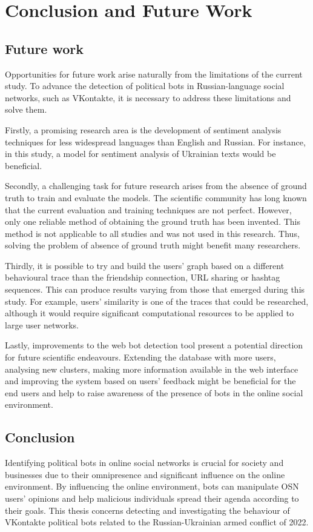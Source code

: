 \chapter{Conclusion and Future Work}
\label{ch:conclusion}

\section{Future work}
Opportunities for future work arise naturally from the limitations of the current study. To advance the detection of political bots in Russian-language social networks, such as VKontakte, it is necessary to address these limitations and solve them.

Firstly, a promising research area is the development of sentiment analysis techniques for less widespread languages than English and Russian. For instance, in this study, a model for sentiment analysis of Ukrainian texts would be beneficial. 

Secondly, a challenging task for future research arises from the absence of ground truth to train and evaluate the models. The scientific community has long known that the current evaluation and training techniques are not perfect. However, only one reliable method of obtaining the ground truth has been invented. This method is not applicable to all studies and was not used in this research. Thus, solving the problem of absence of ground truth might benefit many researchers.

Thirdly, it is possible to try and build the users' graph based on a different behavioural trace than the friendship connection, URL sharing or hashtag sequences. This can produce results varying from those that emerged during this study. For example, users' similarity is one of the traces that could be researched, although it would require significant computational resources to be applied to large user networks.

Lastly, improvements to the web bot detection tool present a potential direction for future scientific endeavours. Extending the database with more users, analysing new clusters, making more information available in the web interface and improving the system based on users' feedback might be beneficial for the end users and help to raise awareness of the presence of bots in the online social environment.

\section{Conclusion}
Identifying political bots in online social networks is crucial for society and businesses due to their omnipresence and significant influence on the online environment. By influencing the online environment, bots can manipulate OSN users' opinions and help malicious individuals spread their agenda according to their goals. This thesis concerns detecting and investigating the behaviour of VKontakte political bots related to the Russian-Ukrainian armed conflict of 2022. 

